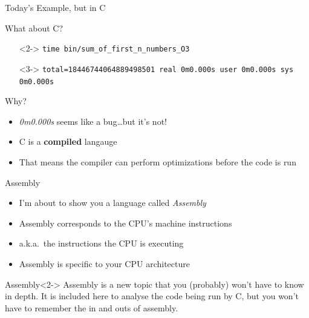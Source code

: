 \documentclass[12pt, aspectration=169]{beamer}
\begin{document}
    \begin{frame}{Today's Example, but in C}
        
    \end{frame}

    \begin{frame}{What about C?}
        \begin{itemize}
            \item[]<2-> \texttt{time bin/sum\_of\_first\_n\_numbers\_O3\newline}
            \item[]<3-> \texttt{total=18446744064889498501\newline
            real 0m0.000s\newline
            user 0m0.000s\newline
            sys 0m0.000s\newline}
        \end{itemize}
    \end{frame}

    \begin{frame}{Why?}
        \begin{itemize}
            \item \textit{0m0.000s} seems like a bug\ldots but it's not!
            \item C is a \textbf{compiled} langauge
            \item That means the compiler can perform optimizations before the code is run
        \end{itemize}
    \end{frame}

    \begin{frame}{Assembly}
        \begin{itemize}
            \item I'm about to show you a language called \textit{Assembly}
            \item Assembly corresponds to the CPU's machine instructions
            \item a.k.a.\ the instructions the CPU is executing
            \item Assembly is specific to your CPU architecture
        \end{itemize}

        \begin{alertblock}{Assembly}<2->
            Assembly is a new topic that you (probably) won't have to know in depth.
            It is included here to analyse the code being run by C, but you won't have to remember the in and outs of
            assembly.
        \end{alertblock}
    \end{frame}
\end{document}
